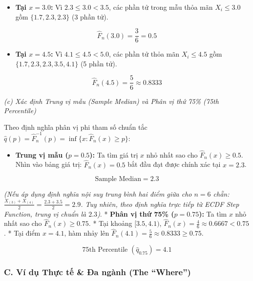 \documentclass[12pt,a4paper]{article}
\begin{document}
\begin{itemize}

\item
  \textbf{Tại \(x = 3.0\):}
  Vì \(2.3 \le 3.0 < 3.5\), các phần tử trong mẫu thỏa mãn \(X_i \le 3.0\) gồm \(\{1.7, 2.3, 2.3\}\) (3 phần tử).
\end{itemize}

\[\widehat{F}_n(3.0) = \frac{3}{6} = 0.5\]

\begin{itemize}

\item
  \textbf{Tại \(x = 4.5\):}
  Vì \(4.1 \le 4.5 < 5.0\), các phần tử thỏa mãn \(X_i \le 4.5\) gồm \(\{1.7, 2.3, 2.3, 3.5, 4.1\}\) (5 phần tử).
\end{itemize}

\[\widehat{F}_n(4.5) = \frac{5}{6} \approx 0.8333\]

\emph{(c) Xác định Trung vị mẫu (Sample Median) và Phân vị thứ 75\% (75th Percentile)}

Theo định nghĩa phân vị phi tham số chuẩn tắc \(\widehat{q}(p) = \widehat{F}_n^{-1}(p) = \inf \{x : \widehat{F}_n(x) \ge p\}\):

\begin{itemize}

\item
  \textbf{Trung vị mẫu (\(p = 0.5\)):}
  Ta tìm giá trị \(x\) nhỏ nhất sao cho \(\widehat{F}_n(x) \ge 0.5\).
  Nhìn vào bảng giá trị: \(\widehat{F}_n(x) = 0.5\) bắt đầu đạt được chính xác tại \(x = 2.3\).
\end{itemize}

\[\text{Sample Median} = 2.3\]

\emph{(Nếu áp dụng định nghĩa nội suy trung bình hai điểm giữa cho \(n=6\) chẵn: \(\frac{X_{(3)} + X_{(4)}}{2} = \frac{2.3 + 3.5}{2} = 2.9\). Tuy nhiên, theo định nghĩa trực tiếp từ ECDF Step Function, trung vị chuẩn là \(2.3\))}.
* \textbf{Phân vị thứ 75\% (\(p = 0.75\)):}
Ta tìm \(x\) nhỏ nhất sao cho \(\widehat{F}_n(x) \ge 0.75\).
* Tại khoảng \([3.5, 4.1)\), \(\widehat{F}_n(x) = \frac{4}{6} \approx 0.6667 < 0.75\).
* Tại điểm \(x = 4.1\), hàm nhảy lên \(\widehat{F}_n(4.1) = \frac{5}{6} \approx 0.8333 \ge 0.75\).

\[\text{75th Percentile } (\widehat{q}_{0.75}) = 4.1\]

\subsubsection{C. Ví dụ Thực tế \& Đa ngành (The ``Where'')}\label{c.-vuxed-dux1ee5-thux1ef1c-tux1ebf-ux111a-nguxe0nh-the-where-5}
\end{document}
